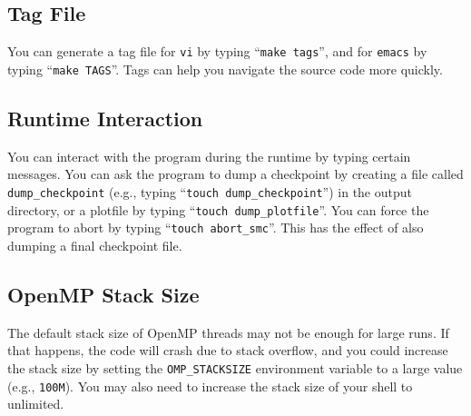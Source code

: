 \documentclass[11pt,letterpaper]{article}
\begin{document}
\subsection{Tag File}

You can generate a tag file for {\tt vi} by typing ``{\tt make
  tags}'', and for {\tt emacs} by typing ``{\tt make TAGS}''.  Tags
can help you navigate the source code more quickly.

\subsection{Runtime Interaction}

You can interact with the program during the runtime by typing certain
messages.  You can ask the program to dump a checkpoint by creating a
file called {\tt dump\_checkpoint} (e.g., typing ``{\tt touch
  dump\_checkpoint}'') in the output directory, or a plotfile by
typing ``{\tt touch dump\_plotfile}''.  You can force the program to
abort by typing ``{\tt touch abort\_smc}''.  This has the effect of
also dumping a final checkpoint file.

\subsection{OpenMP Stack Size}
\label{sec:OMP_STACKSIZE}

The default stack size of OpenMP threads may not be enough for large
runs.  If that happens, the code will crash due to stack overflow, and
you could increase the stack size by setting the {\tt OMP\_STACKSIZE}
environment variable to a large value (e.g., {\tt 100M}).  You may
also need to increase the stack size of your shell to unlimited.




\end{document}
